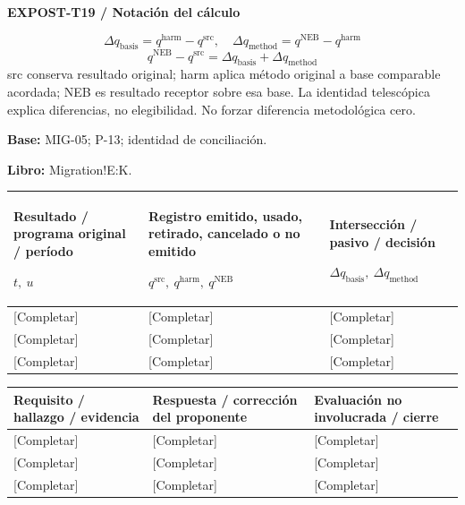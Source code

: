 \textbf{EXPOST-T19 / Notación del cálculo}\par
{\fontsize{9}{11}\selectfont\[ \Delta q_{\mathrm{basis}}=q^{\mathrm{harm}}-q^{\mathrm{src}},\quad \Delta q_{\mathrm{method}}=q^{\mathrm{NEB}}-q^{\mathrm{harm}} \]}
{\fontsize{9}{11}\selectfont\[ q^{\mathrm{NEB}}-q^{\mathrm{src}}=\Delta q_{\mathrm{basis}}+\Delta q_{\mathrm{method}} \]}
src conserva resultado original; harm aplica método original a base comparable acordada; NEB es resultado receptor sobre esa base. La identidad telescópica explica diferencias, no elegibilidad. No forzar diferencia metodológica cero.\par
\textbf{Base:} MIG-05; P-13; identidad de conciliación.\par
\textbf{Libro:} Migration!E:K.\par\endgroup
{\sffamily\fontsize{8.3}{10.3}\selectfont\begin{longtable}{@{}P{54.83mm} P{54.83mm} P{54.83mm}@{}}
\toprule
\textbf{Resultado / programa original / período}\par {\normalfont\fontsize{8.2}{10}\selectfont $t,\ u$} & \textbf{Registro emitido, usado, retirado, cancelado o no emitido}\par {\normalfont\fontsize{8.2}{10}\selectfont $q^{\mathrm{src}},\ q^{\mathrm{harm}},\ q^{\mathrm{NEB}}$} & \textbf{Intersección / pasivo / decisión}\par {\normalfont\fontsize{8.2}{10}\selectfont $\Delta q_{\mathrm{basis}},\ \Delta q_{\mathrm{method}}$}\\\midrule\endhead
\rule{0pt}{8mm}[Completar] & [Completar] & [Completar]\\\hline
\rule{0pt}{8mm}[Completar] & [Completar] & [Completar]\\\hline
\rule{0pt}{8mm}[Completar] & [Completar] & [Completar]\\\hline
\end{longtable}}
{\sffamily\fontsize{8.3}{10.3}\selectfont\begin{longtable}{@{}P{54.83mm} P{54.83mm} P{54.83mm}@{}}
\toprule
\textbf{Requisito / hallazgo / evidencia} & \textbf{Respuesta / corrección del proponente} & \textbf{Evaluación no involucrada / cierre}\\\midrule\endhead
\rule{0pt}{8mm}[Completar] & [Completar] & [Completar]\\\hline
\rule{0pt}{8mm}[Completar] & [Completar] & [Completar]\\\hline
\rule{0pt}{8mm}[Completar] & [Completar] & [Completar]\\\hline
\end{longtable}}
